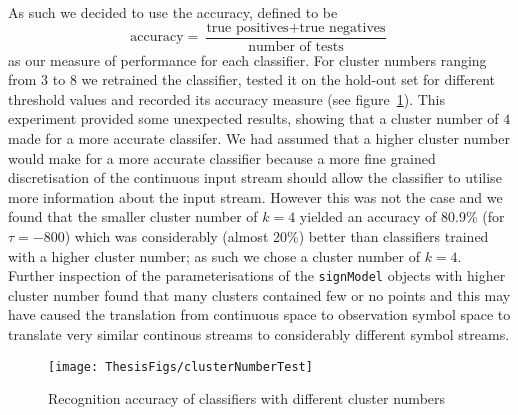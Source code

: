 As such we decided to use the accuracy, defined to be 
\begin{equation*}
\text{accuracy} = \frac{\text{true positives}+\text{true negatives}}{\text{number of tests}}
\end{equation*}
as our measure of performance for each classifier. For cluster numbers ranging from $3$ to $8$ we retrained the classifier, tested it on the hold-out set for different threshold values and recorded its accuracy measure (see figure~\ref{fig:clustTest}). This experiment provided some unexpected results, showing that a cluster number of $4$ made for a more accurate classifer. We had assumed that a higher cluster number would make for a more accurate classifier because a more fine grained discretisation of the continuous input stream should allow the classifier to utilise more information about the input stream. However this was not the case and we found that the smaller cluster number of $k=4$ yielded an accuracy of 80.9\% (for $\tau = -800$) which was considerably (almost 20\%) better than classifiers trained with a higher cluster number; as such we chose a cluster number of $k=4$. Further inspection of the parameterisations of the \verb|signModel| objects with higher cluster number found that many clusters contained few or no points and this may have caused the translation from continuous space to observation symbol space to translate very similar continous streams to considerably different symbol streams.

\begin{figure}[]
        \centering
        \texttt{[image: ThesisFigs/clusterNumberTest]}
        \caption{Recognition accuracy of classifiers with different cluster numbers}\label{fig:clustTest}
\end{figure}


